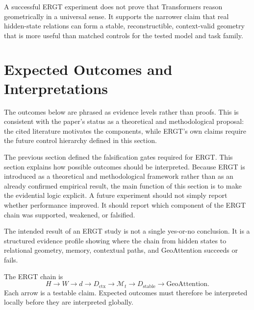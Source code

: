 \documentclass[11pt]{article}
\begin{document}
\begin{ergtclaim}
A successful ERGT experiment does not prove that Transformers reason geometrically in a universal sense. It supports the narrower claim that real hidden-state relations can form a stable, reconstructible, context-valid geometry that is more useful than matched controls for the tested model and task family.
\end{ergtclaim}




\setcounter{section}{9}
\section{Expected Outcomes and Interpretations}
\noindent The outcomes below are phrased as evidence levels rather than proofs. This is consistent with the paper's status as a theoretical and methodological proposal: the cited literature motivates the components, while ERGT's own claims require the future control hierarchy defined in this section.

\label{sec:expected-outcomes}

The previous section defined the falsification gates required for ERGT. This section explains how possible outcomes should be interpreted. Because ERGT is introduced as a theoretical and methodological framework rather than as an already confirmed empirical result, the main function of this section is to make the evidential logic explicit. A future experiment should not simply report whether performance improved. It should report which component of the ERGT chain was supported, weakened, or falsified.

\begin{ergtclaim}
The intended result of an ERGT study is not a single yes-or-no conclusion. It is a structured evidence profile showing where the chain from hidden states to relational geometry, memory, contextual paths, and GeoAttention succeeds or fails.
\end{ergtclaim}

The ERGT chain is
\[
H
\rightarrow
W
\rightarrow
d
\rightarrow
D_{\mathrm{ctx}}
\rightarrow
\mathcal{M}_t
\rightarrow
D_{\mathrm{stable}}
\rightarrow
\mathrm{GeoAttention}.
\]
Each arrow is a testable claim. Expected outcomes must therefore be interpreted locally before they are interpreted globally.
\end{document}
